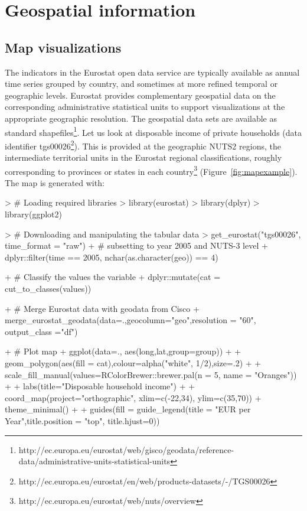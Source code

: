 \section{Geospatial information}

\subsection{Map visualizations}

The indicators in the Eurostat open data service are typically
available as annual time series grouped by country, and sometimes at
more refined temporal or geographic levels. Eurostat provides
complementary geospatial data on the corresponding administrative
statistical units to support visualizations at the appropriate
geographic resolution. The geospatial data sets are available as
standard
shapefiles\footnote{http://ec.europa.eu/eurostat/web/gisco/geodata/reference-data/administrative-units-statistical-units}. Let
us look at disposable income of private households (data identifier
tgs00026\footnote{http://ec.europa.eu/eurostat/en/web/products-datasets/-/TGS00026}). This
is provided at the geographic NUTS2 regions, the intermediate
territorial units in the Eurostat regional classifications, roughly
corresponding to provinces or states in each
country\footnote{http://ec.europa.eu/eurostat/web/nuts/overview}
(Figure~\ref{fig:mapexample}). The map is generated with:

\begin{example}
> # Loading required libraries
> library(eurostat)
> library(dplyr)
> library(ggplot2)

> # Downloading and manipulating the tabular data
> get_eurostat("tgs00026", time_format = "raw") %
+   # subsetting to year 2005 and NUTS-3 level
+   dplyr::filter(time == 2005, nchar(as.character(geo)) == 4) %

+   # Classify the values the variable
+   dplyr::mutate(cat = cut_to_classes(values)) %

+   # Merge Eurostat data with geodata from Cisco
+   merge_eurostat_geodata(data=.,geocolumn="geo",resolution = "60", output_class ="df") %

+   # Plot map
+   ggplot(data=., aes(long,lat,group=group)) +
+   geom_polygon(aes(fill = cat),colour=alpha("white", 1/2),size=.2) +
+   scale_fill_manual(values=RColorBrewer::brewer.pal(n = 5, name = "Oranges")) +
+   labs(title="Disposable household income") +
+   coord_map(project="orthographic", xlim=c(-22,34), ylim=c(35,70)) + theme_minimal() +
+   guides(fill = guide_legend(title = "EUR per Year",title.position = "top", title.hjust=0))
\end{example}


